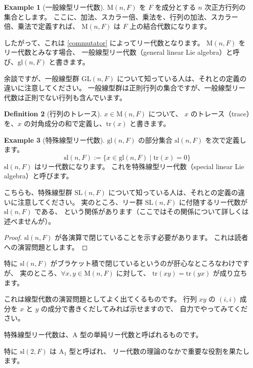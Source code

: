 \documentclass{ltjsarticle}
\theoremstyle{definition}
\newtheorem{definition}{Definition}[section]
\newtheorem{example}[definition]{Example}
\begin{document}
\begin{example}[一般線型リー代数]
    $\mathrm{M}(n,F)$ を $F$ を成分とする $n$ 次正方行列の集合とします。
    ここに、加法、スカラー倍、乗法を、行列の加法、スカラー倍、乗法で定義すれば、
    $\mathrm{M}(n,F)$ は $F$ 上の結合代数になります。

    したがって、これは \ref{commutator} によってリー代数となります。
    $\mathrm{M}(n,F)$ をリー代数とみなす場合、
    一般線型リー代数（general linear Lie algebra）と呼び、$\mathrm{gl}(n,F)$ と書きます。
\end{example}

余談ですが、一般線型群 $\mathrm{GL}(n,F)$ について知っている人は、それとの定義の違いに注意してください。
一般線型群は正則行列の集合ですが、一般線型リー代数は正則でない行列も含んでいます。

\begin{definition}[行列のトレース]
    $x \in \mathrm{M}(n,F)$ について、
    $x$ のトレース（trace）を、$x$ の対角成分の和で定義し、$\mathrm{tr}(x)$ と書きます。
\end{definition}

\begin{example}[特殊線型リー代数]
    $\mathrm{gl}(n,F)$ の部分集合 $\mathrm{sl}(n,F)$ を次で定義します。
    \[
        \mathrm{sl}(n,F) := \{x \in \mathrm{gl}(n,F) \mid \mathrm{tr}(x) = 0\}
    \]
    $\mathrm{sl}(n,F)$ はリー代数になります。
    これを特殊線型リー代数（special linear Lie algebra）と呼びます。
\end{example}

こちらも、特殊線型群 $\mathrm{SL}(n,F)$ について知っている人は、それとの定義の違いに注意してください。
実のところ、リー群 $\mathrm{SL}(n,F)$ に付随するリー代数が $\mathrm{sl}(n,F)$ である、
という関係があります（ここではその関係について詳しくは述べませんが）。

\begin{proof}
    $\mathrm{sl}(n,F)$ が各演算で閉じていることを示す必要があります。
    これは読者への演習問題とします。
\end{proof}

特に $\mathrm{sl}(n,F)$ がブラケット積で閉じているというのが肝心なところなわけですが、
実のところ、$\forall x,y \in \mathrm{M}(n,F)$ に対して、
$\mathrm{tr}(xy) = \mathrm{tr}(yx)$ が成り立ちます。

これは線型代数の演習問題としてよく出てくるものです。
行列 $xy$ の $(i,i)$ 成分を $x$ と $y$ の成分で書きくだしてみれば示せますので、
自力でやってみてください。

特殊線型リー代数は、$\mathrm{A}$ 型の単純リー代数と呼ばれるものです。

特に $\mathrm{sl}(2,F)$ は $\mathrm{A}_1$ 型と呼ばれ、
リー代数の理論のなかで重要な役割を果たします。
\end{document}
